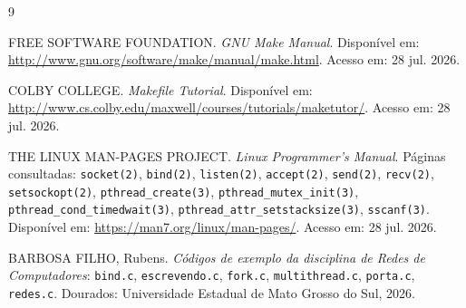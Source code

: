 \documentclass[12pt,a4paper]{article}
\begin{document}
\begin{thebibliography}{9}
\raggedright

FREE SOFTWARE FOUNDATION. \textit{GNU Make Manual}. Disponível em:
\url{http://www.gnu.org/software/make/manual/make.html}. Acesso em: 28 jul.
2026.

COLBY COLLEGE. \textit{Makefile Tutorial}. Disponível em:
\url{http://www.cs.colby.edu/maxwell/courses/tutorials/maketutor/}. Acesso em:
28 jul. 2026.

THE LINUX MAN-PAGES PROJECT. \textit{Linux Programmer's Manual}. Páginas
consultadas: \texttt{socket(2)}, \texttt{bind(2)}, \texttt{listen(2)},
\texttt{accept(2)}, \texttt{send(2)}, \texttt{recv(2)},
\texttt{setsockopt(2)}, \texttt{pthread\_create(3)},
\texttt{pthread\_mutex\_init(3)}, \texttt{pthread\_cond\_timedwait(3)},
\texttt{pthread\_attr\_setstacksize(3)}, \texttt{sscanf(3)}. Disponível em:
\url{https://man7.org/linux/man-pages/}. Acesso em: 28 jul. 2026.

BARBOSA FILHO, Rubens. \textit{Códigos de exemplo da disciplina de Redes de
Computadores}: \texttt{bind.c}, \texttt{escrevendo.c}, \texttt{fork.c},
\texttt{multithread.c}, \texttt{porta.c}, \texttt{redes.c}. Dourados:
Universidade Estadual de Mato Grosso do Sul, 2026.

%

\end{thebibliography}
\end{document}
